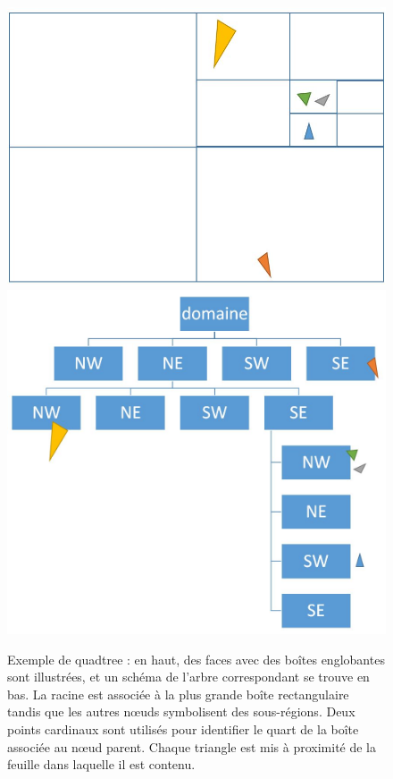 \documentclass[12pt,a4paper]{report}
\begin{document}
\begin{figure}[t]
\begin{center}
\includegraphics[scale=0.5]{boundingBoxes.jpg}
\includegraphics[scale=0.45]{quadtree.jpg}
\caption{Exemple de quadtree : en haut, des faces avec des boîtes englobantes sont illustrées, et un schéma de l'arbre correspondant se trouve en bas. La racine est associée à la plus grande boîte rectangulaire tandis que les autres n\oe{}uds symbolisent des sous-régions. Deux points cardinaux sont utilisés pour identifier le quart de la boîte associée au n\oe{}ud parent. Chaque triangle est mis à proximité de la feuille dans laquelle il est contenu.}\label{quadtree}
\end{center}
\end{figure}
\end{document}
